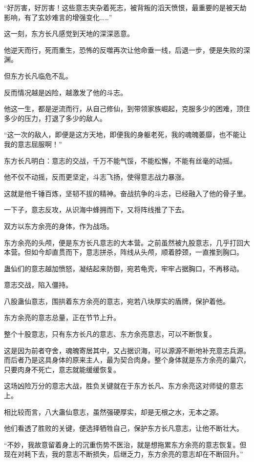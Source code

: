 \begin{this_body}
“好厉害，好厉害！这些意志夹杂着死志，被背叛的滔天愤恨，最重要的是被天劫影响，有了玄妙难言的增强变化……”

这一刻，东方长凡感觉到天地的深深恶意。

他逆天而行，死而重生，恐怖的反噬再次让他命垂一线，后退一步，便是失败的深渊。

但东方长凡临危不乱。

反而情况越是凶险，越激发了他的斗志。

他这一生，都是逆流而行，从自己修仙，到带领家族崛起，克服多少的困难，顶住多少的压力，打退了多少的敌人。

“这一次的敌人，即便是这方天地，即便我的身躯老死，我的魂魄萎靡，也不能让我的意志屈服啊！”

东方长凡明白：意志的交战，千万不能气馁，不能松懈，不能有丝毫的动摇。

他不仅不动摇，反而更坚定，斗志飞扬，使得意志战力暴涨。

这就是他千锤百炼，坚韧不拔的精神。奋战抗争的斗志，已经融入了他的骨子里。

一下子，意志反攻，从识海中蜂拥而下，又将阵线推了下去。

双方以东方余亮的身体，作为战场。

东方余亮的头颅，便是东方长凡意志的大本营。之前虽然被九股意志，几乎打回大本营。但如今却直贯而下，意志拼杀，阵线从头颅，顺着脖颈，一直推到胸口。

蛊仙们的意志越加愤怒，凝结起来防御，宛若龟壳，牢牢占据胸口，不再移动。

意志交战，陷入僵持。

八股蛊仙意志，围拱着东方余亮的意志，宛若八块厚实的盾牌，保护着他。

东方余亮的意志总量，正在节节上升。

整个十股意志，只有东方长凡的意志、东方余亮意志，可以不断恢复。

这是因为前者夺舍，魂魄寄居其中，又占据识海，可以源源不断地补充意志兵源。而后者乃是这具身体的原来主人，最为契合肉身。整个身体就是东方余亮的巢穴，只要肉身不死亡，意志就能缓缓恢复。

这场凶险万分的意志大战，胜负关键就在于东方长凡、东方余亮这对师徒的意志上。

相比较而言，八大蛊仙意志，虽然强硬厚实，却是无根之水，无本之源。

他们看透了胜败的关键，便选择牺牲自己，保护东方长凡意志，让他不断壮大。

“不妙，我故意留着身上的沉重伤势不医治，就是想拖累东方余亮的意志恢复。但现在对耗下去，我的意志不断损失，后继乏力，东方余亮的意志却在不断回升。”


\end{this_body}
